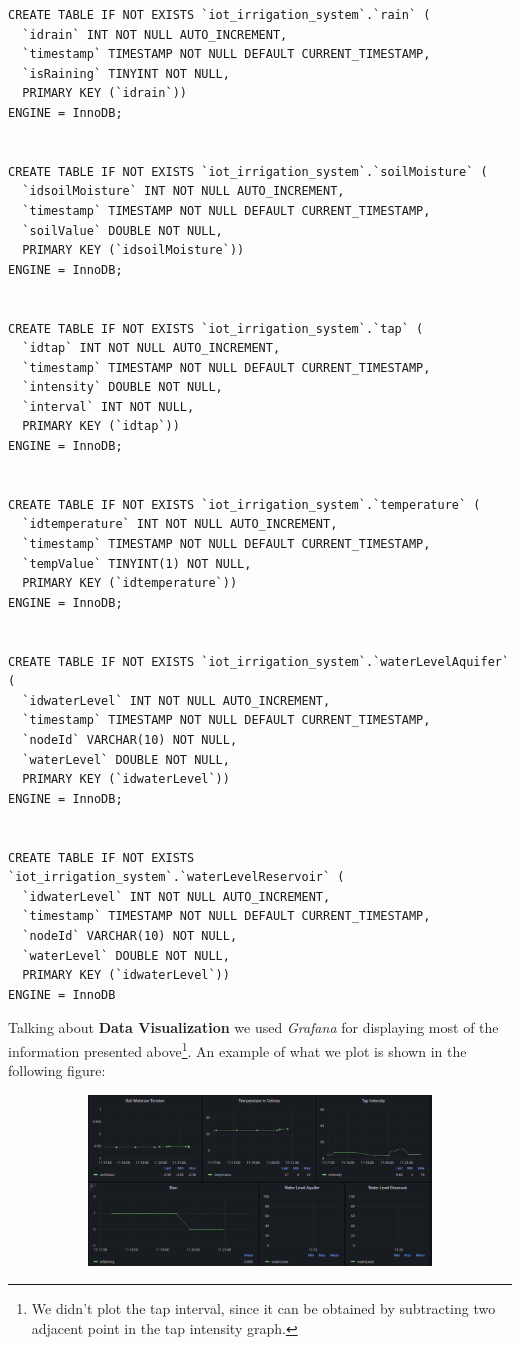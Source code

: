 \begin{verbatim}
CREATE TABLE IF NOT EXISTS `iot_irrigation_system`.`rain` (
  `idrain` INT NOT NULL AUTO_INCREMENT,
  `timestamp` TIMESTAMP NOT NULL DEFAULT CURRENT_TIMESTAMP,
  `isRaining` TINYINT NOT NULL,
  PRIMARY KEY (`idrain`))
ENGINE = InnoDB;


CREATE TABLE IF NOT EXISTS `iot_irrigation_system`.`soilMoisture` (
  `idsoilMoisture` INT NOT NULL AUTO_INCREMENT,
  `timestamp` TIMESTAMP NOT NULL DEFAULT CURRENT_TIMESTAMP,
  `soilValue` DOUBLE NOT NULL,
  PRIMARY KEY (`idsoilMoisture`))
ENGINE = InnoDB;


CREATE TABLE IF NOT EXISTS `iot_irrigation_system`.`tap` (
  `idtap` INT NOT NULL AUTO_INCREMENT,
  `timestamp` TIMESTAMP NOT NULL DEFAULT CURRENT_TIMESTAMP,
  `intensity` DOUBLE NOT NULL,
  `interval` INT NOT NULL,
  PRIMARY KEY (`idtap`))
ENGINE = InnoDB;


CREATE TABLE IF NOT EXISTS `iot_irrigation_system`.`temperature` (
  `idtemperature` INT NOT NULL AUTO_INCREMENT,
  `timestamp` TIMESTAMP NOT NULL DEFAULT CURRENT_TIMESTAMP,
  `tempValue` TINYINT(1) NOT NULL,
  PRIMARY KEY (`idtemperature`))
ENGINE = InnoDB;


CREATE TABLE IF NOT EXISTS `iot_irrigation_system`.`waterLevelAquifer` (
  `idwaterLevel` INT NOT NULL AUTO_INCREMENT,
  `timestamp` TIMESTAMP NOT NULL DEFAULT CURRENT_TIMESTAMP,
  `nodeId` VARCHAR(10) NOT NULL,
  `waterLevel` DOUBLE NOT NULL,
  PRIMARY KEY (`idwaterLevel`))
ENGINE = InnoDB;


CREATE TABLE IF NOT EXISTS `iot_irrigation_system`.`waterLevelReservoir` (
  `idwaterLevel` INT NOT NULL AUTO_INCREMENT,
  `timestamp` TIMESTAMP NOT NULL DEFAULT CURRENT_TIMESTAMP,
  `nodeId` VARCHAR(10) NOT NULL,
  `waterLevel` DOUBLE NOT NULL,
  PRIMARY KEY (`idwaterLevel`))
ENGINE = InnoDB
\end{verbatim}


Talking about \textbf{Data Visualization} we used \textit{Grafana} for displaying most of the information presented above\footnote{We didn't plot the tap interval, since it can be obtained by subtracting two adjacent point in the tap intensity graph.}. An example of what we plot is shown in the following figure:

\begin{figure}[H]
	\begin{subfigure}{\textwidth}
	\centering
		\includegraphics[width=1\linewidth]{img/grafana.png} 
	\end{subfigure}
\end{figure}

